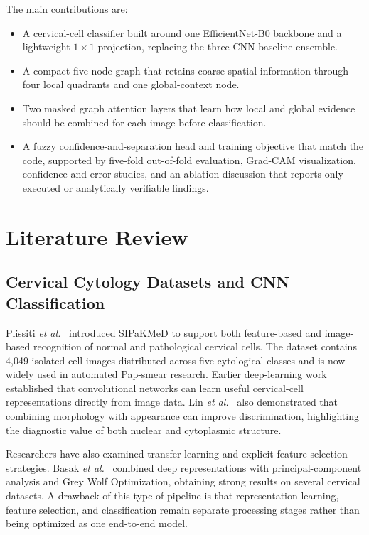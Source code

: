 \documentclass[10pt,conference]{IEEEtran}
\begin{document}
The main contributions are:
\begin{itemize}
    \item A cervical-cell classifier built around one EfficientNet-B0 backbone and a lightweight $1\times1$ projection, replacing the three-CNN baseline ensemble.
    \item A compact five-node graph that retains coarse spatial information through four local quadrants and one global-context node.
    \item Two masked graph attention layers that learn how local and global evidence should be combined for each image before classification.
    \item A fuzzy confidence-and-separation head and training objective that match the code, supported by five-fold out-of-fold evaluation, Grad-CAM visualization, confidence and error studies, and an ablation discussion that reports only executed or analytically verifiable findings.
\end{itemize}

\section{Literature Review}

\subsection{Cervical Cytology Datasets and CNN Classification}

Plissiti \emph{et al.}~\cite{plissiti2018sipakmed} introduced SIPaKMeD to support both feature-based and image-based recognition of normal and pathological cervical cells. The dataset contains 4,049 isolated-cell images distributed across five cytological classes and is now widely used in automated Pap-smear research. Earlier deep-learning work established that convolutional networks can learn useful cervical-cell representations directly from image data. Lin \emph{et al.}~\cite{lin2018morphology} also demonstrated that combining morphology with appearance can improve discrimination, highlighting the diagnostic value of both nuclear and cytoplasmic structure.

Researchers have also examined transfer learning and explicit feature-selection strategies. Basak \emph{et al.}~\cite{basak2021pca} combined deep representations with principal-component analysis and Grey Wolf Optimization, obtaining strong results on several cervical datasets. A drawback of this type of pipeline is that representation learning, feature selection, and classification remain separate processing stages rather than being optimized as one end-to-end model.
\end{document}
